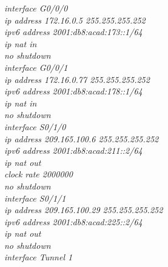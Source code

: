 \documentclass[12pt,a4paper]{report}
\begin{document}
\hspace*{2cm}\textit{interface G0/0/0\\
\hspace*{2cm}ip address 172.16.0.5 255.255.255.252\\
\hspace*{2cm}ipv6 address 2001:db8:acad:173::1/64\\
\hspace*{2cm}ip nat in\\
\hspace*{2cm}no shutdown\\
\hspace*{2cm}interface G0/0/1\\
\hspace*{2cm}ip address 172.16.0.77 255.255.255.252\\
\hspace*{2cm}ipv6 address 2001:db8:acad:178::1/64\\
\hspace*{2cm}ip nat in\\
\hspace*{2cm}no shutdown\\
\hspace*{2cm}interface S0/1/0\\
\hspace*{2cm}ip address 209.165.100.6 255.255.255.252\\
\hspace*{2cm}ipv6 address 2001:db8:acad:211::2/64\\
\hspace*{2cm}ip nat out\\
\hspace*{2cm}clock rate 2000000 \\
\hspace*{2cm}no shutdown\\
\hspace*{2cm}interface S0/1/1\\
\hspace*{2cm}ip address 209.165.100.29 255.255.255.252\\
\hspace*{2cm}ipv6 address 2001:db8:acad:225::2/64\\
\hspace*{2cm}ip nat out\\
\hspace*{2cm}no shutdown\\
\hspace*{2cm}interface Tunnel 1\\
}
\end{document}
